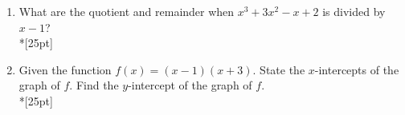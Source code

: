 \documentclass[12pt, oneside]{article}
\begin{document}
\begin{enumerate}
\item What are the quotient and remainder when $x^3+3x^2-x+2$ is divided by $x - 1$?\\*[25pt]

\item Given the function $f(x)=(x-1)(x+3)$. State the $x$-intercepts of the graph of $f$. Find the $y$-intercept of the graph of $f$.\\*[25pt]





\end{enumerate}
\end{document}
